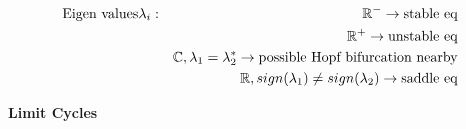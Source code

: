 \begin{align*}
\text{Eigen values} &  \lambda_i : & \mathbb{R}^{-} \to \text{stable eq} \\ && \mathbb{R}^{+} \to \text{unstable eq} \\ && \mathbb{C}, \lambda_1 = \lambda_2^* \to \text{possible Hopf bifurcation nearby} \\ & & \mathbb{R}, sign(\lambda_1) \neq sign(\lambda_2) \to \text{saddle eq} \\
\end{align*}
\item \textbf{Limit Cycles}
\begin{align*}
\end{align*}